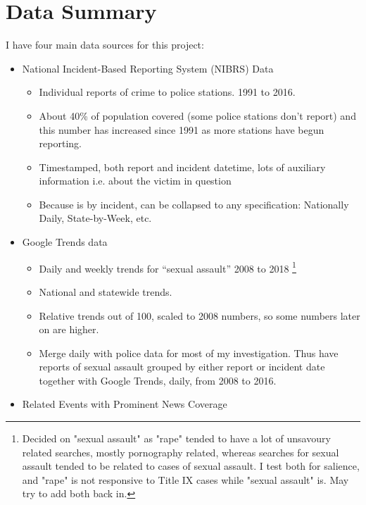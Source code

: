 \documentclass[AER,draftmode]{AEA}
\begin{document}
\section{Data Summary}

I have four main data sources for this project: 
\begin{itemize}
    \item National Incident-Based Reporting System (NIBRS) Data
    \begin{itemize}
        \item Individual reports of crime to police stations. 1991 to 2016.
        \item About 40\% of population covered (some police stations don’t report) and this number has increased since 1991 as more stations have begun reporting.
        \item Timestamped, both report and incident datetime, lots of auxiliary information i.e. about the victim in question
        \item Because is by incident, can be collapsed to any specification: Nationally Daily, State-by-Week, etc. 
    \end{itemize}
    \item Google Trends data
    \begin{itemize}
        \item Daily and weekly trends for “sexual assault” 2008 to 2018 \footnote{Decided on "sexual assault" as "rape" tended to have a lot of unsavoury related searches, mostly pornography related, whereas searches for sexual assault tended to be related to cases of sexual assault. I test both for salience, and "rape" is not responsive to Title IX cases while "sexual assault" is. May try to add both back in.} 
        \item National and statewide trends.
        \item Relative trends out of 100, scaled to 2008 numbers, so some numbers later on are higher.
        \item Merge daily with police data for most of my investigation. Thus have reports of sexual assault grouped by either report or incident date together with Google Trends, daily, from 2008 to 2016. 
    \end{itemize}
    \item Related Events with Prominent News Coverage

\end{itemize}
\end{document}
